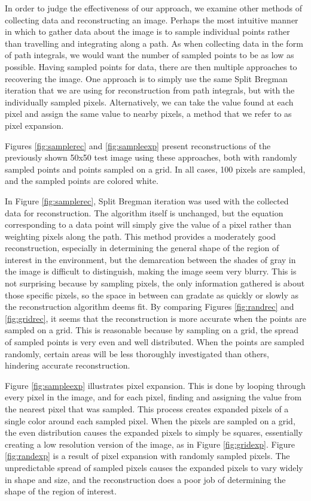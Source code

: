 \documentclass[english]{article}\usepackage[]{graphicx}\usepackage[]{color}
\begin{document}
In order to judge the effectiveness of our approach, we examine other methods of collecting data and reconstructing an image. Perhaps the most intuitive manner in which to gather data about the image is to sample individual points rather than travelling and integrating along a path. As when collecting data in the form of path integrals, we would want the number of sampled points to be as low as possible. Having sampled points for data, there are then multiple approaches to recovering the image. One approach is to simply use the same Split Bregman iteration that we are using for reconstruction from path integrals, but with the individually sampled pixels. Alternatively, we can take the value found at each pixel and assign the same value to nearby pixels, a method that we refer to as pixel expansion.

Figures \ref{fig:samplerec} and \ref{fig:sampleexp} present reconstructions of the previously shown 50x50 test image using these approaches, both with randomly sampled points and points sampled on a grid. In all cases, 100 pixels are sampled, and the sampled points are colored white.

In Figure \ref{fig:samplerec}, Split Bregman iteration was used with the collected data for reconstruction. The algorithm itself is unchanged, but the equation corresponding to a data point will simply give the value of a pixel rather than weighting pixels along the path. This method provides a moderately good reconstruction, especially in determining the general shape of the region of interest in the environment, but the demarcation between the shades of gray in the image is difficult to distinguish, making the image seem very blurry. This is not surprising because by sampling pixels, the only information gathered is about those specific pixels, so the space in between can gradate as quickly or slowly as the reconstruction algorithm deems fit. By comparing Figures \ref{fig:randrec} and \ref{fig:gridrec}, it seems that the reconstruction is more accurate when the points are sampled on a grid. This is reasonable because by sampling on a grid, the spread of sampled points is very even and well distributed. When the points are sampled randomly, certain areas will be less thoroughly investigated than others, hindering accurate reconstruction.

Figure \ref{fig:sampleexp} illustrates pixel expansion. This is done by looping through every pixel in the image, and for each pixel, finding and assigning the value from the nearest pixel that was sampled. This process creates expanded pixels of a single color around each sampled pixel. When the pixels are sampled on a grid, the even distribution causes the expanded pixels to simply be squares, essentially creating a low resolution version of the image, as in Figure \ref{fig:gridexp}. Figure \ref{fig:randexp} is a result of pixel expansion with randomly sampled pixels. The unpredictable spread of sampled pixels causes the expanded pixels to vary widely in shape and size, and the reconstruction does a poor job of determining the shape of the region of interest.
\end{document}
